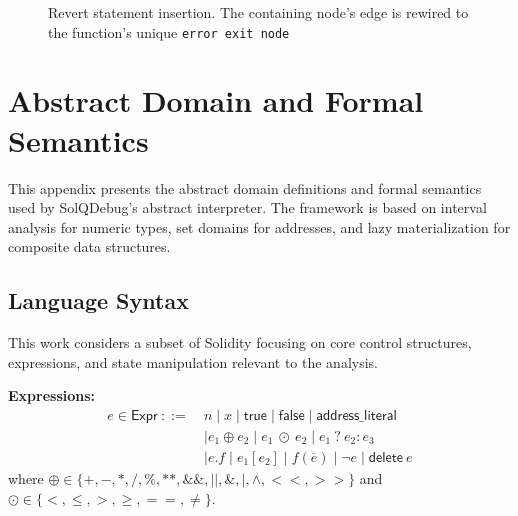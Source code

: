 \documentclass[pdflatex,sn-basic]{sn-jnl}%
\theoremstyle{thmstyleone}%
\theoremstyle{thmstyletwo}%
\theoremstyle{thmstylethree}%
\begin{document}
\begin{figure}[H]
\centering
{}
\caption{Revert statement insertion. The containing node's edge is rewired to the function's unique \texttt{error exit node}}
\label{fig:new-revert}
\end{figure}

\section{Abstract Domain and Formal Semantics}
\label{app:semantics}

This appendix presents the abstract domain definitions and formal semantics used by SolQDebug's abstract interpreter. The framework is based on interval analysis for numeric types, set domains for addresses, and lazy materialization for composite data structures.

\subsection{Language Syntax}

This work considers a subset of Solidity focusing on core control structures, expressions, and state manipulation relevant to the analysis.

\noindent\textbf{Expressions:}
\begin{align*}
e \in \mathsf{Expr}\ ::=\ & n \mid x \mid \mathsf{true} \mid \mathsf{false} \mid \mathsf{address\_literal}\\
& \mid e_1 \oplus e_2 \mid e_1\ \odot\ e_2 \mid e_1\ ?\ e_2 : e_3\\
& \mid e.f \mid e_1[e_2] \mid f(\overline{e}) \mid \neg e \mid \mathsf{delete}\ e
\end{align*}
where $\oplus \in \{+,-,*,/,\%,**,\&\&,||,\&,|,\wedge,<<,>>\}$ and $\odot \in \{<,\le,>,\ge,==,\ne\}$.
\end{document}
